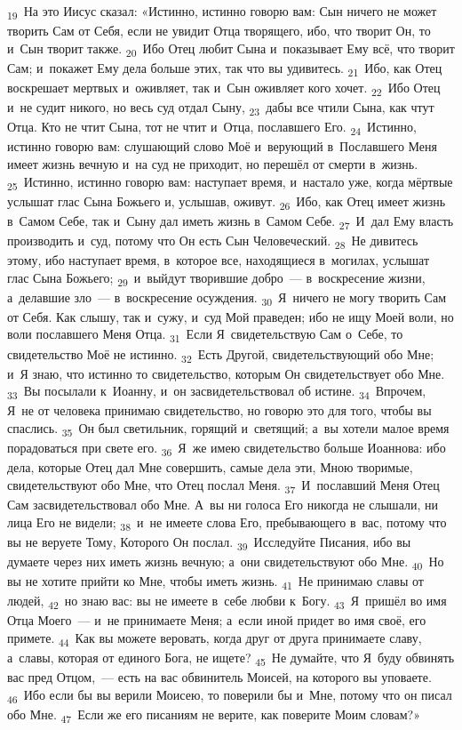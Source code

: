 \documentclass[a4paper,12pt]{article}
\begin{document}
\textsubscript{19}~На это Иисус сказал: «Истинно, истинно говорю вам: Сын ничего не может творить Сам от Себя, если не увидит Отца творящего, ибо, что творит Он, то и~Сын творит также. \textsubscript{20}~Ибо Отец любит Сына и~показывает Ему всё, что творит Сам; и~покажет Ему дела больше этих, так что вы удивитесь. \textsubscript{21}~Ибо, как Отец воскрешает мертвых и~оживляет, так и~Сын оживляет кого хочет. \textsubscript{22}~Ибо Отец и~не судит никого, но весь суд отдал Сыну, \textsubscript{23}~дабы все чтили Сына, как чтут Отца. Кто не чтит Сына, тот не чтит и~Отца, пославшего Его. \textsubscript{24}~Истинно, истинно говорю вам: слушающий слово Моё и~верующий в~Пославшего Меня имеет жизнь вечную и~на суд не приходит, но перешёл от смерти в~жизнь. \textsubscript{25}~Истинно, истинно говорю вам: наступает время, и~настало уже, когда мёртвые услышат глас Сына Божьего и, услышав, оживут. \textsubscript{26}~Ибо, как Отец имеет жизнь в~Самом Себе, так и~Сыну дал иметь жизнь в~Самом Себе. \textsubscript{27}~И~дал Ему власть производить и~суд, потому что Он есть Сын Человеческий. \textsubscript{28}~Не дивитесь этому, ибо наступает время, в~которое все, находящиеся в~могилах, услышат глас Сына Божьего; \textsubscript{29}~и~выйдут творившие добро~--- в~воскресение жизни, а~делавшие зло~--- в~воскресение осуждения. \textsubscript{30}~Я~ничего не могу творить Сам от Себя. Как слышу, так и~сужу, и~суд Мой праведен; ибо не ищу Моей воли, но воли пославшего Меня Отца. \textsubscript{31}~Если Я~свидетельствую Сам о~Себе, то свидетельство Моё не истинно. \textsubscript{32}~Есть Другой, свидетельствующий обо Мне; и~Я знаю, что истинно то свидетельство, которым Он свидетельствует обо Мне. \textsubscript{33}~Вы посылали к~Иоанну, и~он засвидетельствовал об истине. \textsubscript{34}~Впрочем, Я~не от человека принимаю свидетельство, но говорю это для того, чтобы вы спаслись. \textsubscript{35}~Он был светильник, горящий и~светящий; а~вы хотели малое время порадоваться при свете его. \textsubscript{36}~Я~же имею свидетельство больше Иоаннова: ибо дела, которые Отец дал Мне совершить, самые дела эти, Мною творимые, свидетельствуют обо Мне, что Отец послал Меня. \textsubscript{37}~И~пославший Меня Отец Сам засвидетельствовал обо Мне. А~вы ни голоса Его никогда не слышали, ни лица Его не видели; \textsubscript{38}~и~не имеете слова Его, пребывающего в~вас, потому что вы не веруете Тому, Которого Он послал. \textsubscript{39}~Исследуйте Писания, ибо вы думаете через них иметь жизнь вечную; а~они свидетельствуют обо Мне. \textsubscript{40}~Но вы не хотите прийти ко Мне, чтобы иметь жизнь. \textsubscript{41}~Не принимаю славы от людей, \textsubscript{42}~но знаю вас: вы не имеете в~себе любви к~Богу. \textsubscript{43}~Я~пришёл во имя Отца Моего~--- и~не принимаете Меня; а~если иной придет во имя своё, его примете. \textsubscript{44}~Как вы можете веровать, когда друг от друга принимаете славу, а~славы, которая от единого Бога, не ищете? \textsubscript{45}~Не думайте, что Я~буду обвинять вас пред Отцом,~--- есть на вас обвинитель Моисей, на которого вы уповаете. \textsubscript{46}~Ибо если бы вы верили Моисею, то поверили бы и~Мне, потому что он писал обо Мне. \textsubscript{47}~Если же его писаниям не верите, как поверите Моим словам?» 
\end{document}
